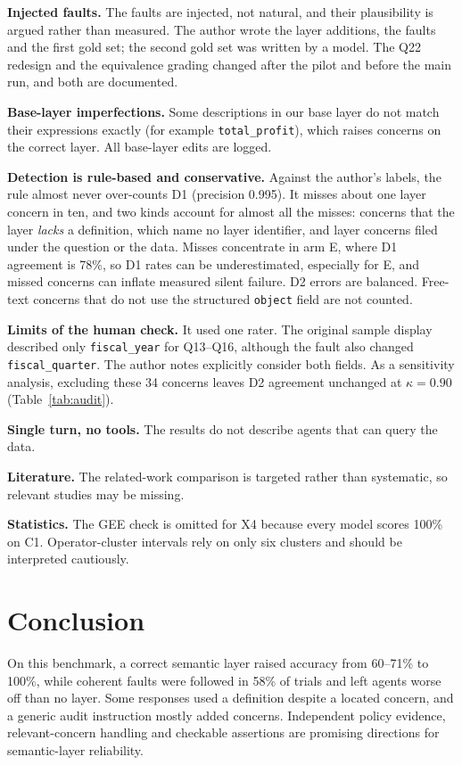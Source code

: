 \documentclass[conference]{IEEEtran}
\newcommand{\id}[1]{\texttt{#1}}
\begin{document}
\textbf{Injected faults.} The faults are injected, not natural, and their plausibility is argued rather than measured. The author wrote the layer additions, the faults and the first gold set; the second gold set was written by a model. The Q22 redesign and the equivalence grading changed after the pilot and before the main run, and both are documented.

\textbf{Base-layer imperfections.} Some descriptions in our base layer do not match their expressions exactly (for example \id{total\_profit}), which raises concerns on the correct layer. All base-layer edits are logged.

\textbf{Detection is rule-based and conservative.} Against the author's labels, the rule almost never over-counts D1 (precision 0.995). It misses about one layer concern in ten, and two kinds account for almost all the misses: concerns that the layer \emph{lacks} a definition, which name no layer identifier, and layer concerns filed under the question or the data. Misses concentrate in arm E, where D1 agreement is 78\%, so D1 rates can be underestimated, especially for E, and missed concerns can inflate measured silent failure. D2 errors are balanced. Free-text concerns that do not use the structured \id{object} field are not counted.

\textbf{Limits of the human check.} It used one rater. The original sample display described only \id{fiscal\_year} for Q13--Q16, although the fault also changed \id{fiscal\_quarter}. The author notes explicitly consider both fields. As a sensitivity analysis, excluding these 34 concerns leaves D2 agreement unchanged at $\kappa = 0.90$ (Table~\ref{tab:audit}).

\textbf{Single turn, no tools.} The results do not describe agents that can query the data.

\textbf{Literature.} The related-work comparison is targeted rather than systematic, so relevant studies may be missing.

\textbf{Statistics.} The GEE check is omitted for X4 because every model scores 100\% on C1. Operator-cluster intervals rely on only six clusters and should be interpreted cautiously.

\section{Conclusion}

On this benchmark, a correct semantic layer raised accuracy from 60--71\% to 100\%, while coherent faults were followed in 58\% of trials and left agents worse off than no layer. Some responses used a definition despite a located concern, and a generic audit instruction mostly added concerns. Independent policy evidence, relevant-concern handling and checkable assertions are promising directions for semantic-layer reliability.
\end{document}
